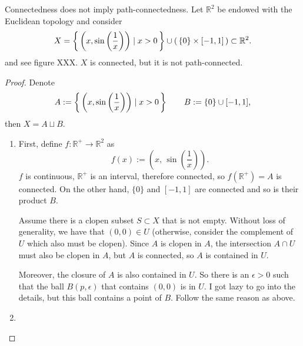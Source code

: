 \begin{example}
    Connectedness does not imply path-connectedness. Let \(\mathbb{R}^2\) be endowed with the Euclidean topology and consider 
    \begin{equation*}
        X = \left\{\, \left(x, \sin\left(\frac{1}{x}\right)\right) \mid x > 0 \,\right\} \cup \left(\,\{0\} \times [-1, 1]\,\right) \subset \mathbb{R}^2 \text{.}
    \end{equation*}
    and see figure XXX. \(X\) is connected, but it is not path-connected.
\end{example}
\begin{proof}
    Denote
    \begin{equation*}
        A := \left\{\, \left(x, \sin\left(\frac{1}{x}\right)\right) \mid x > 0 \,\right\} \qquad B := \{0\} \cup [-1, 1] \text{,}
    \end{equation*}
    then \(X = A \sqcup B\).
    \begin{enumerate}
        \item First, define \(f: \mathbb{R}^+ \longrightarrow \mathbb{R}^2\) as
        \begin{equation*}
            f(x) := \left(x,\, \sin\left(\frac{1}{x}\right)\right) \text{.}
        \end{equation*}
        \(f\) is continuous, \(\mathbb{R}^+\) is an interval, therefore connected, so \(f(\mathbb{R}^+) = A\) is connected. On the other hand, \(\{0\}\) and \([-1, 1]\) are connected and so is their product \(B\).
        
        Assume there is a clopen subset \(S \subset X\) that is not empty. Without loss of generality, we have that \((0, 0) \in U\) (otherwise, consider the complement of \(U\) which also must be clopen). Since \(A\) is clopen in \(A\), the intersection \(A \cap U\) must also be clopen in \(A\), but \(A\) is connected, so \(A\) is contained in \(U\).

        Moreover, the closure of \(A\) is also contained in \(U\). So there is an \(\epsilon > 0\) such that the ball \(B(p, \epsilon)\) that contains \((0, 0)\) is in \(U\). I got lazy to go into the details, but this ball contains a point of \(B\). Follow the same reason as above.
        \item 
    \end{enumerate}
\end{proof}